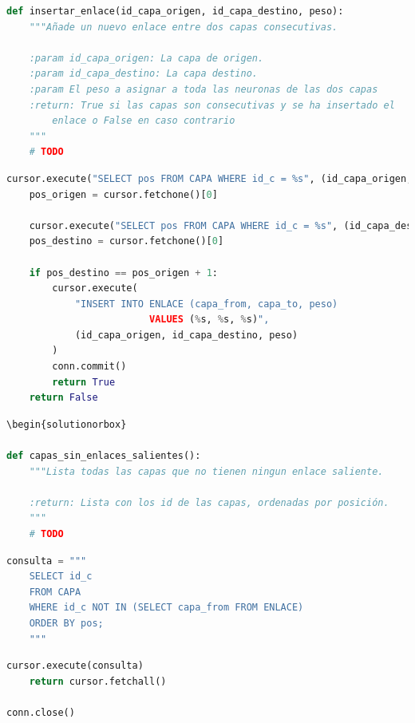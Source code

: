 \documentclass[
    12pt,
    a4paper,
    addpoints,
    answers,
    convocatoria=ord,
    titulacion=CD,
    curso=2024/2025,
]{db-exam}
\begin{document}
\begin{questions}
\begin{lstlisting}[language=Python]
def insertar_enlace(id_capa_origen, id_capa_destino, peso):
    """Añade un nuevo enlace entre dos capas consecutivas.
    
    :param id_capa_origen: La capa de origen.
    :param id_capa_destino: La capa destino.
    :param El peso a asignar a toda las neuronas de las dos capas
    :return: True si las capas son consecutivas y se ha insertado el
        enlace o False en caso contrario
    """
    # TODO
\end{lstlisting}

\begin{solutionorbox}
\begin{lstlisting}[language=Python]
    cursor.execute("SELECT pos FROM CAPA WHERE id_c = %s", (id_capa_origen,))
    pos_origen = cursor.fetchone()[0]

    cursor.execute("SELECT pos FROM CAPA WHERE id_c = %s", (id_capa_destino,))
    pos_destino = cursor.fetchone()[0]

    if pos_destino == pos_origen + 1:
        cursor.execute(
            "INSERT INTO ENLACE (capa_from, capa_to, peso)
                         VALUES (%s, %s, %s)",
            (id_capa_origen, id_capa_destino, peso)
        )
        conn.commit()
        return True
    return False
\end{lstlisting}
\end{solutionorbox}

\begin{lstlisting}[language=Python]
\begin{solutionorbox}

def capas_sin_enlaces_salientes():
    """Lista todas las capas que no tienen ningun enlace saliente.

    :return: Lista con los id de las capas, ordenadas por posición.
    """
    # TODO
\end{lstlisting}

\begin{solutionorbox}
\begin{lstlisting}[language=Python]
    consulta = """
    SELECT id_c
    FROM CAPA
    WHERE id_c NOT IN (SELECT capa_from FROM ENLACE)
    ORDER BY pos;
    """
\end{lstlisting}
\end{solutionorbox}

\begin{lstlisting}[language=Python]
    cursor.execute(consulta)
    return cursor.fetchall()

conn.close()
\end{lstlisting}



\end{questions}
\end{document}
